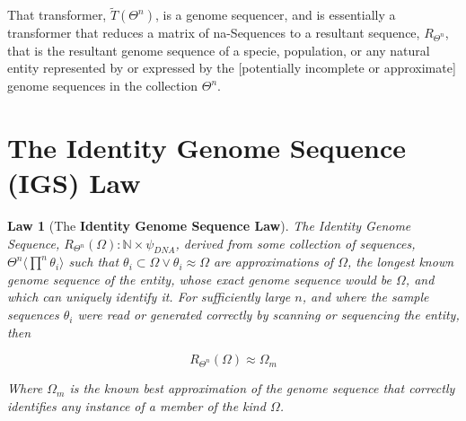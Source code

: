 \documentclass[a4paper, 18pt]{book} %
\newtheorem{law}{Law}
\begin{document}
That transformer, $\tilde{T}(\Theta^n)$, is a genome sequencer, and is essentially a transformer that reduces a matrix of na-Sequences to a resultant sequence, $R_{\Theta^n}$, that is the resultant genome sequence of a specie, population, or any natural entity represented by or expressed by the [potentially incomplete or approximate] genome sequences in the collection $\Theta^n$.


\section{The Identity Genome Sequence (IGS) Law}
\label{SECIGSL}

\begin{law}[The \textbf{Identity Genome Sequence Law}]
\label{LAWGDL}
The Identity Genome Sequence, $R_{\Theta^n}(\Omega): \mathbb{N} \times \psi_{DNA}$, derived from some collection of sequences, $\Theta^n \langle \prod\limits^n \theta_i \rangle$ such that $\theta_i \subset \Omega \lor \theta_i \approx \Omega$ are approximations of $\Omega$, the longest known genome sequence of the entity, whose exact genome sequence would be $\Omega$, and which can uniquely identify it. For sufficiently large $n$, and where the sample sequences $\theta_i$ were read or generated correctly by scanning or sequencing the entity, then 

\begin{equation}
\label{SEQRofOM}
R_{\Theta^n}(\Omega) \approx \Omega_m
\end{equation} 

Where $\Omega_m$ is the known best approximation of the genome sequence that correctly identifies any instance of a member of the kind $\Omega$.
\end{law}
\end{document}
